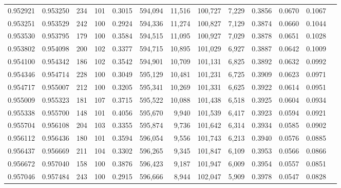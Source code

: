 \begin{tabular}{rrrrrrrrrrrrr}
0.952921 & 0.953250 &   234 & 101 &                                     0.3015 & 594,094 &  11,516 & 100,727 &   7,229 & 0.3856 & 0.0670 & 0.1067 \\
0.953251 & 0.953529 &   242 & 100 &                                     0.2924 & 594,336 &  11,274 & 100,827 &   7,129 & 0.3874 & 0.0660 & 0.1044 \\
0.953530 & 0.953795 &   179 & 100 &                                     0.3584 & 594,515 &  11,095 & 100,927 &   7,029 & 0.3878 & 0.0651 & 0.1028 \\
0.953802 & 0.954098 &   200 & 102 &                                     0.3377 & 594,715 &  10,895 & 101,029 &   6,927 & 0.3887 & 0.0642 & 0.1009 \\
0.954100 & 0.954342 &   186 & 102 &                                     0.3542 & 594,901 &  10,709 & 101,131 &   6,825 & 0.3892 & 0.0632 & 0.0992 \\
0.954346 & 0.954714 &   228 & 100 &                                     0.3049 & 595,129 &  10,481 & 101,231 &   6,725 & 0.3909 & 0.0623 & 0.0971 \\
0.954717 & 0.955007 &   212 & 100 &                                     0.3205 & 595,341 &  10,269 & 101,331 &   6,625 & 0.3922 & 0.0614 & 0.0951 \\
0.955009 & 0.955323 &   181 & 107 &                                     0.3715 & 595,522 &  10,088 & 101,438 &   6,518 & 0.3925 & 0.0604 & 0.0934 \\
0.955338 & 0.955700 &   148 & 101 &                                     0.4056 & 595,670 &   9,940 & 101,539 &   6,417 & 0.3923 & 0.0594 & 0.0921 \\
0.955704 & 0.956108 &   204 & 103 &                                     0.3355 & 595,874 &   9,736 & 101,642 &   6,314 & 0.3934 & 0.0585 & 0.0902 \\
0.956112 & 0.956436 &   180 & 101 &                                     0.3594 & 596,054 &   9,556 & 101,743 &   6,213 & 0.3940 & 0.0576 & 0.0885 \\
0.956437 & 0.956669 &   211 & 104 &                                     0.3302 & 596,265 &   9,345 & 101,847 &   6,109 & 0.3953 & 0.0566 & 0.0866 \\
0.956672 & 0.957040 &   158 & 100 &                                     0.3876 & 596,423 &   9,187 & 101,947 &   6,009 & 0.3954 & 0.0557 & 0.0851 \\
0.957046 & 0.957484 &   243 & 100 &                                     0.2915 & 596,666 &   8,944 & 102,047 &   5,909 & 0.3978 & 0.0547 & 0.0828 \\

\end{tabular}
